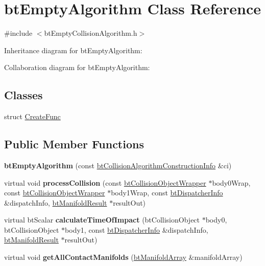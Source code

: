 \hypertarget{classbt_empty_algorithm}{\section{bt\+Empty\+Algorithm Class Reference}
\label{classbt_empty_algorithm}
}


{\ttfamily \#include $<$bt\+Empty\+Collision\+Algorithm.\+h$>$}



Inheritance diagram for bt\+Empty\+Algorithm\+:


Collaboration diagram for bt\+Empty\+Algorithm\+:
\subsection*{Classes}
\begin{DoxyCompactItemize}
\item 
struct \hyperlink{structbt_empty_algorithm_1_1_create_func}{Create\+Func}
\end{DoxyCompactItemize}
\subsection*{Public Member Functions}
\begin{DoxyCompactItemize}
\item 
\hypertarget{classbt_empty_algorithm_a4c68f947391c678e2e9b4a5f1e71e41c}{{\bfseries bt\+Empty\+Algorithm} (const \hyperlink{structbt_collision_algorithm_construction_info}{bt\+Collision\+Algorithm\+Construction\+Info} \&ci)}\label{classbt_empty_algorithm_a4c68f947391c678e2e9b4a5f1e71e41c}

\item 
\hypertarget{classbt_empty_algorithm_ada6f4b8418ca7c73d3523d5b4a87e89a}{virtual void {\bfseries process\+Collision} (const \hyperlink{structbt_collision_object_wrapper}{bt\+Collision\+Object\+Wrapper} $\ast$body0\+Wrap, const \hyperlink{structbt_collision_object_wrapper}{bt\+Collision\+Object\+Wrapper} $\ast$body1\+Wrap, const \hyperlink{structbt_dispatcher_info}{bt\+Dispatcher\+Info} \&dispatch\+Info, \hyperlink{classbt_manifold_result}{bt\+Manifold\+Result} $\ast$result\+Out)}\label{classbt_empty_algorithm_ada6f4b8418ca7c73d3523d5b4a87e89a}

\item 
\hypertarget{classbt_empty_algorithm_a55f2d297e9aa153c20940bd45aa12218}{virtual bt\+Scalar {\bfseries calculate\+Time\+Of\+Impact} (bt\+Collision\+Object $\ast$body0, bt\+Collision\+Object $\ast$body1, const \hyperlink{structbt_dispatcher_info}{bt\+Dispatcher\+Info} \&dispatch\+Info, \hyperlink{classbt_manifold_result}{bt\+Manifold\+Result} $\ast$result\+Out)}\label{classbt_empty_algorithm_a55f2d297e9aa153c20940bd45aa12218}

\item 
\hypertarget{classbt_empty_algorithm_aa43e4b766663a04a38d30f43bed2133b}{virtual void {\bfseries get\+All\+Contact\+Manifolds} (\hyperlink{classbt_aligned_object_array}{bt\+Manifold\+Array} \&manifold\+Array)}\label{classbt_empty_algorithm_aa43e4b766663a04a38d30f43bed2133b}

\end{DoxyCompactItemize}
